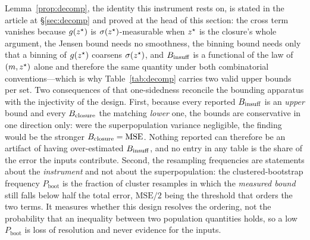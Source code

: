 \noindent Lemma~\ref{prop:decomp}, the identity this instrument rests on, is stated in
the article at \S\ref{sec:decomp} and proved at the head of this section: the cross term vanishes because $g(z^\star)$ is
$\sigma(z^\star)$-measurable when $z^\star$ is the closure's whole argument, the Jensen bound needs no
smoothness, the binning bound needs only that a binning of $g(z^\star)$ coarsens
$\sigma(z^\star)$, and $B_{\mathrm{insuff}}$ is a functional of the law of $(m,z^\star)$ alone and therefore the
same quantity under both combinatorial conventions---which is why Table~\ref{tab:decomp} carries two
valid upper bounds per set. Two consequences of that one-sidedness reconcile the bounding apparatus
with the injectivity of the design. First, because
every reported $B_{\mathrm{insuff}}$ is an \emph{upper} bound and every $B_{\mathrm{closure}}$ the matching \emph{lower} one,
the bounds are conservative in one direction only: were the superpopulation variance
negligible, the finding would be the stronger $B_{\mathrm{closure}}=\mathrm{MSE}$. Nothing reported can therefore be an
artifact of having over-estimated $B_{\mathrm{insuff}}$, and no entry in any table is the share of the error the
inputs contribute. Second, the resampling frequencies are statements about the \emph{instrument} and
not about the superpopulation: the clustered-bootstrap frequency $P_{\mathrm{boot}}$ is the fraction
of cluster resamples in which the \emph{measured bound} still falls below half the total error,
$\mathrm{MSE}/2$ being the threshold that orders the two terms. It measures whether this design
resolves the ordering, not the probability that an inequality between two population quantities
holds, so a low $P_{\mathrm{boot}}$ is loss of resolution and never evidence for the inputs.

